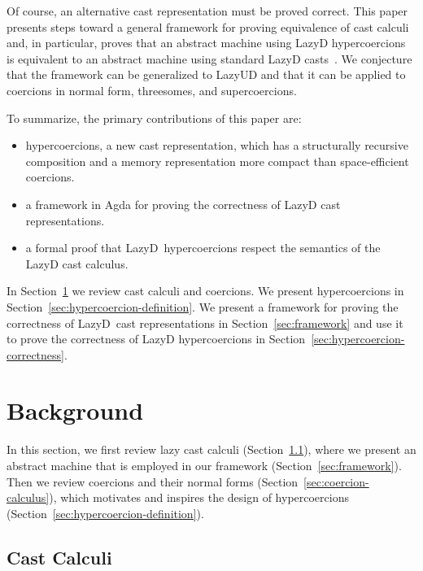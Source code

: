 \documentclass[acmsmall,review]{acmart}\settopmatter{printfolios=true,printccs=false,printacmref=false}
\newcommand{\lazyUD}{Lazy\;UD}
\newcommand{\lazyD}{Lazy\;D}
\begin{document}
Of course, an alternative cast representation must be proved
correct. This paper presents steps toward a general framework for
proving equivalence of cast calculi and, in particular, proves that an
abstract machine using \lazyD{} hypercoercions is equivalent to an
abstract machine using standard \lazyD{}
casts~\citep{siek2009exploring}. We conjecture that the framework can
be generalized to \lazyUD{} and that it can be applied to coercions in
normal form, threesomes, and supercoercions.

To summarize, the primary contributions of this paper are:
\begin{itemize}
\item hypercoercions, a new cast representation, which
  has a structurally recursive composition and a memory
  representation more compact than space-efficient coercions.
\item a framework in Agda for proving the correctness of \lazyD{} cast
  representations.
\item a formal proof that \lazyD\ hypercoercions respect the semantics
  of the \lazyD{} cast calculus.
\end{itemize}

In Section~\ref{sec:background} we review cast calculi and coercions. 
We present hypercoercions in
Section~\ref{sec:hypercoercion-definition}.  We present a framework
for proving the correctness of \lazyD\ cast representations in
Section~\ref{sec:framework} and use it to prove the correctness of
\lazyD{} hypercoercions in
Section~\ref{sec:hypercoercion-correctness}.

\section{Background} \label{sec:background}

In this section, we first review lazy cast calculi
(Section~\ref{sec:cast-calculi}), where we present an abstract machine that is 
employed in our framework (Section~\ref{sec:framework}). Then we review 
coercions and their normal forms (Section~\ref{sec:coercion-calculus}), which 
motivates and inspires the design of hypercoercions 
(Section~\ref{sec:hypercoercion-definition}).

\subsection{Cast Calculi}
\label{sec:cast-calculi}
\end{document}
